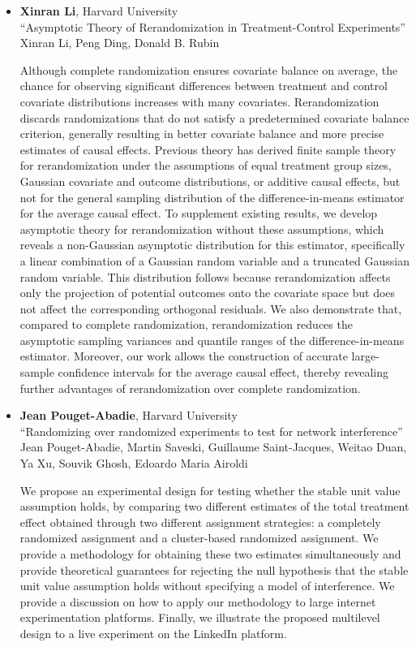 \begin{itemize}
\item \textbf{Xinran Li}, Harvard University \\
``Asymptotic Theory of Rerandomization in Treatment-Control Experiments'' \\
Xinran Li, Peng Ding, Donald B. Rubin


Although complete randomization ensures covariate balance on average, the chance for observing significant differences between treatment and control covariate distributions increases with many covariates. Rerandomization discards randomizations that do not satisfy a predetermined covariate balance criterion, generally resulting in better covariate balance and more precise estimates of causal effects. Previous theory has derived finite sample theory for rerandomization under the assumptions of equal treatment group sizes, Gaussian covariate and outcome distributions, or additive causal effects, but not for the general sampling distribution of the difference-in-means estimator for the average causal effect. To supplement existing results, we develop asymptotic theory for rerandomization without these assumptions, which reveals a non-Gaussian asymptotic distribution for this estimator, specifically a linear combination of a Gaussian random variable and a truncated Gaussian random variable. This distribution follows because rerandomization affects only the projection of potential outcomes onto the covariate space but does not affect the corresponding orthogonal residuals. We also demonstrate that, compared to complete randomization, rerandomization reduces the asymptotic sampling variances and quantile ranges of the difference-in-means estimator. Moreover, our work allows the construction of accurate large-sample confidence intervals for the average causal effect, thereby revealing further advantages of rerandomization over complete randomization.

\item \textbf{Jean Pouget-Abadie}, Harvard University \\
``Randomizing over randomized experiments to test for network interference'' \\
Jean Pouget-Abadie, Martin Saveski, Guillaume Saint-Jacques, Weitao Duan, Ya Xu, Souvik Ghosh, Edoardo Maria Airoldi


We propose an experimental design for testing whether the stable unit value assumption holds, by comparing two different estimates of the total treatment effect obtained through two different assignment strategies: a completely randomized assignment and a cluster-based randomized assignment. We provide a methodology for obtaining these two estimates simultaneously and provide theoretical guarantees for rejecting the null hypothesis that the stable unit value assumption holds without specifying a model of interference. We provide a discussion on how to apply our methodology to large internet experimentation platforms. Finally, we illustrate the proposed multilevel design to a live experiment on the LinkedIn platform.


\end{itemize}
